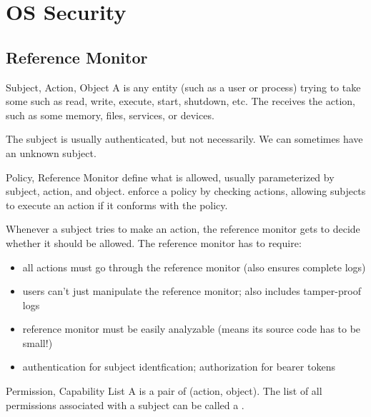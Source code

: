 \chapter{OS Security}
\section{Reference Monitor}

\begin{dfnbox}{Subject, Action, Object}{}
    A  is any entity (such as a user or process) trying to take some  such as read, write, execute, start, shutdown, etc. The  receives the action, such as some memory, files, services, or devices.
\end{dfnbox}

The subject is usually authenticated, but not necessarily. We can sometimes have an unknown subject.

\begin{dfnbox}{Policy, Reference Monitor}{}
     define what is allowed, usually parameterized by subject, action, and object.  enforce a policy by checking actions, allowing subjects to execute an action if it conforms with the policy.
\end{dfnbox}

Whenever a subject tries to make an action, the reference monitor gets to decide whether it should be allowed. The reference monitor has to require:

\begin{itemize}
    \item {} all actions must go through the reference monitor (also ensures complete logs)
    \item {} users can't just manipulate the reference monitor; also includes tamper-proof logs
    \item {} reference monitor must be easily analyzable (means its source code has to be small!)
    \item {} authentication for subject identfication; authorization for bearer tokens
\end{itemize}

\begin{dfnbox}{Permission, Capability List}{}
    A  is a pair of (action, object). The list of all permissions associated with a subject can be called a .
\end{dfnbox}

